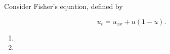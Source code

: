Consider Fisher's equation, defined by

$$
u_t = u_{xx} + u(1 - u).
$$

\begin{enumerate}
    \item 
    \pagebreak
    \item 
\end{enumerate}